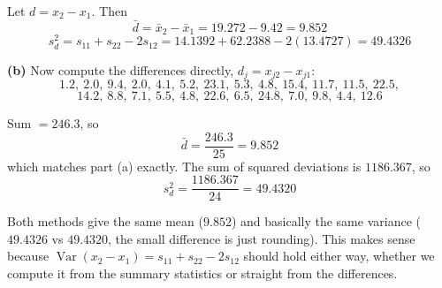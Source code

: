 \documentclass[11pt]{article}
\begin{document}
Let $d=x_2-x_1$. Then
\[
\bar d=\bar x_2-\bar x_1=19.272-9.42=\boxed{9.852}
\]
\[
s_d^2=s_{11}+s_{22}-2s_{12}=14.1392+62.2388-2(13.4727)=\boxed{49.4326}
\]

\textbf{(b)} Now compute the differences directly, $d_j=x_{j2}-x_{j1}$:
\[
1.2,\ 2.0,\ 9.4,\ 2.0,\ 4.1,\ 5.2,\ 23.1,\ 5.3,\ 4.8,\ 15.4,\ 11.7,\ 11.5,\ 22.5,
\]
\[
14.2,\ 8.8,\ 7.1,\ 5.5,\ 4.8,\ 22.6,\ 6.5,\ 24.8,\ 7.0,\ 9.8,\ 4.4,\ 12.6
\]

Sum $=246.3$, so
\[
\bar d=\frac{246.3}{25}=\boxed{9.852}
\]
which matches part (a) exactly. The sum of squared deviations is $1186.367$, so
\[
s_d^2=\frac{1186.367}{24}=\boxed{49.4320}
\]

Both methods give the same mean ($9.852$) and basically the same variance ($49.4326$ vs
$49.4320$, the small difference is just rounding). This makes sense because
$\operatorname{Var}(x_2-x_1)=s_{11}+s_{22}-2s_{12}$ should hold either way, whether we
compute it from the summary statistics or straight from the differences.
\end{document}
